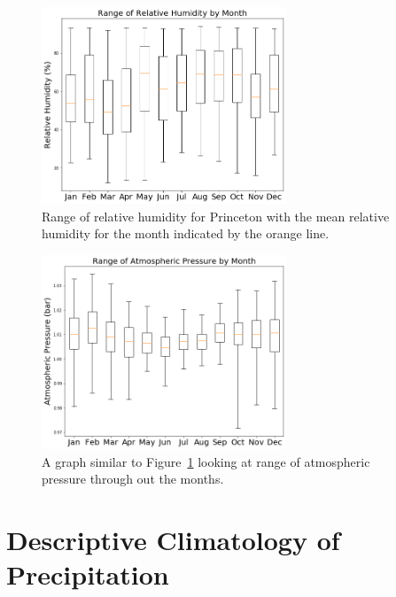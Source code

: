 \documentclass[11pt]{report}
\begin{document}
\clearpage
\begin{figure}[t]
	\centering
	\includegraphics[width=0.65\textwidth]{Figures/RH_range.png}
	\caption[Range of Relative Humidity in Princeton
          (2017--2021)]{\label{RH_range} Range of relative humidity for
          Princeton with the mean relative humidity for the month indicated
          by the orange line.}
\end{figure}
\begin{figure}[b]
	\centering
	\includegraphics[width=0.65\textwidth]{Figures/AP_range.png}
	\caption[Range of Atmospheric Pressure in Princeton (2017--2021)
        ]{\label{AP_range} A graph similar to Figure~\ref{RH_range} looking
          at range of atmospheric pressure through out the months.}
\end{figure}
\clearpage
\section{Descriptive Climatology of Precipitation}\label{sec:dcp}
\end{document}
